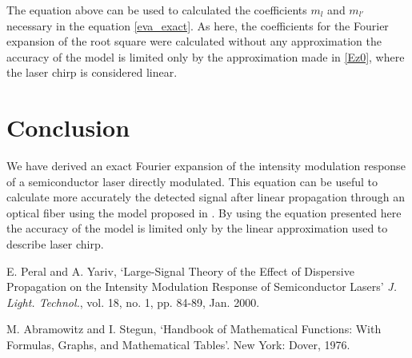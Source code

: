 \documentclass[twocolumn]{el-author}
\begin{document}
The equation above can be used to calculated the coefficients $m_l$ and $m_{l'}$ necessary in the equation \eqref{eva_exact}. As here, the coefficients for the Fourier expansion of the root square were calculated without any approximation the accuracy of the model is limited only by the approximation made in \eqref{Ez0}, where the laser chirp is considered linear.

\section{Conclusion}
We have derived an exact Fourier expansion of the intensity modulation response of a semiconductor laser directly modulated. This equation can be useful to calculate more accurately the detected signal after linear propagation through an optical fiber using the model proposed in \cite{eva}. By using the equation presented here the accuracy of the model is limited only by the linear approximation used to describe laser chirp.

\begin{thebibliography}{}

E. Peral and A. Yariv, `Large-Signal Theory of the Effect of Dispersive Propagation on the Intensity Modulation Response of Semiconductor Lasers' \textit{J. Light. Technol.}, vol. 18, no. 1, pp. 84-89, Jan. 2000.

M. Abramowitz and I. Stegun, `Handbook of Mathematical Functions: With Formulas, Graphs, and Mathematical Tables'. New York: Dover, 1976.

\end{thebibliography}
\end{document}
